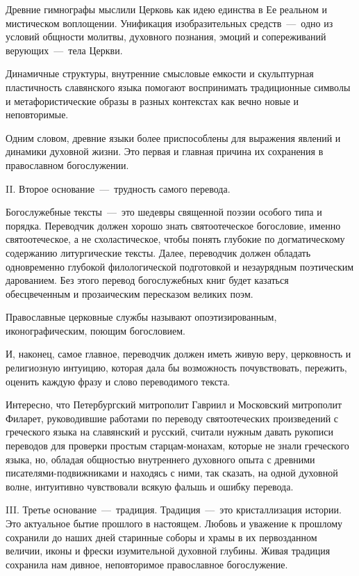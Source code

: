 \documentclass[11pt,a4paper,oneside]{memoir}
\begin{document}
    Древние гимнографы мыслили Церковь как идею единства в Ее реальном и мистическом воплощении. Унификация изобразительных средств~---~одно из условий общности молитвы, духовного познания, эмоций и сопереживаний верующих~---~тела Церкви.
    
    Динамичные структуры, внутренние смысловые емкости и скульптурная пластичность славянского языка помогают воспринимать традиционные символы и метафористические образы в разных контекстах как вечно новые и неповторимые.
    
    Одним словом, древние языки более приспособлены для выражения явлений и динамики духовной жизни. Это первая и главная причина их сохранения в православном богослужении.
    
    II. Второе основание~---~трудность самого перевода.
    
    Богослужебные тексты~---~это шедевры священной поэзии особого типа и порядка. Переводчик должен хорошо знать святоотеческое богословие, именно святоотеческое, а не схоластическое, чтобы понять глубокие по догматическому содержанию литургические тексты. Далее, переводчик должен обладать одновременно глубокой филологической подготовкой и незаурядным поэтическим дарованием. Без этого перевод богослужебных книг будет казаться обесцвеченным и прозаическим пересказом великих поэм.
    
    Православные церковные службы называют опоэтизированным, иконографическим, поющим богословием.
    
    И, наконец, самое главное, переводчик должен иметь живую веру, церковность и религиозную интуицию, которая дала бы возможность почувствовать, пережить, оценить каждую фразу и слово переводимого текста.
    
    Интересно, что Петербургский митрополит Гавриил и Московский митрополит Филарет, руководившие работами по переводу святоотеческих произведений с греческого языка на славянский и русский, считали нужным давать рукописи переводов для проверки простым старцам-монахам, которые не знали греческого языка, но, обладая общностью внутреннего духовного опыта с древними писателями-подвижниками и находясь с ними, так сказать, на одной духовной волне, интуитивно чувствовали всякую фальшь и ошибку перевода.
    
    III. Третье основание~---~традиция. Традиция~---~это кристаллизация истории. Это актуальное бытие прошлого в настоящем. Любовь и уважение к прошлому сохранили до наших дней старинные соборы и храмы в их первозданном величии, иконы и фрески изумительной духовной глубины. Живая традиция сохранила нам дивное, неповторимое православное богослужение.
    
\end{document}
